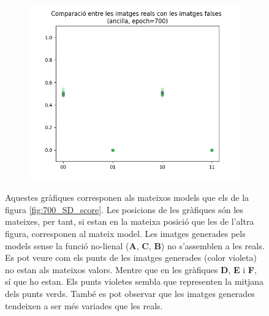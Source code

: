 \begin{figure}[H]
\begin{subfigure}[b]{.32\linewidth}
		\includegraphics[width=\linewidth]{figures/data/scatter_plot_A6.png}
		\caption{}
	\end{subfigure}
	\label{fig:700_images}
	\caption{Aquestes gràfiques corresponen als mateixos models que els de la figura \ref{fig:700_SD_score}. Les posicions de les gràfiques són les mateixes, per tant, si estan en la mateixa posició que les de l'altra figura, corresponen al mateix model. Les imatges generades pels models sense la funció no-lienal (\textbf{A}, \textbf{C}, \textbf{B}) no s'assemblen a les reals. Es pot veure com els punts de les imatges generades (color violeta) no estan als mateixos valors. Mentre que en les gràfiques \textbf{D}, \textbf{E} i \textbf{F}, sí que ho estan. Els punts violetes sembla que representen la mitjana dels punts verds. També es pot observar que les imatges generades tendeixen a ser més variades que les reals.}
	
\end{figure}



